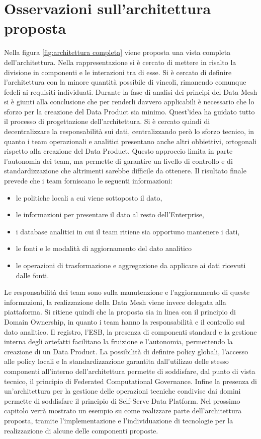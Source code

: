 \documentclass[12pt]{report}
\begin{document}
\section{Osservazioni sull'architettura proposta}
Nella figura \ref{fig:architettura completa} viene proposta una vista completa dell'architettura.
Nella rappresentazione si è cercato di mettere in risalto la divisione in componenti e le interazioni tra di esse.
Si è cercato di definire l'architettura con la minore quantità possibile di vincoli, rimanendo comunque fedeli ai requisiti individuati.
Durante la fase di analisi dei principi del Data Mesh si è giunti alla conclusione che per renderli davvero applicabili è necessario che lo sforzo per la creazione del Data Product sia minimo.
Quest'idea ha guidato tutto il processo di progettazione dell'architettura.
Si è cercato quindi di decentralizzare la responsabilità sui dati, centralizzando però lo sforzo tecnico, in quanto i team operazionali e analitici presentano anche altri obbiettivi, ortogonali rispetto alla creazione del Data Product.
Questo approccio limita in parte l'autonomia dei team, ma permette di garantire un livello di controllo e di standardizzazione che altrimenti sarebbe difficile da ottenere.
Il risultato finale prevede che i team forniscano le seguenti informazioni:
\begin{itemize}
    \item le politiche locali a cui viene sottoposto il dato,
    \item le informazioni per presentare il dato al resto dell'Enterprise,
    \item i database analitici in cui il team ritiene sia opportuno mantenere i dati,
    \item le fonti e le modalità di aggiornamento del dato analitico
    \item le operazioni di trasformazione e aggregazione da applicare ai dati ricevuti dalle fonti.
\end{itemize}
Le responsabilità dei team sono sulla manutenzione e l'aggiornamento di queste informazioni, la realizzazione della Data Mesh viene invece delegata alla piattaforma.
Si ritiene quindi che la proposta sia in linea con il principio di Domain Ownership, in quanto i team hanno la responsabilità  e il controllo sul dato analitico.
Il registro, l'ESB, la presenza di componenti standard e la gestione interna degli artefatti facilitano la fruizione e l'autonomia, permettendo la creazione di un Data Product.
La possibilità di definire policy globali, l'accesso alle policy locali e la standardizzazione garantita dall'utilizzo delle stesso componenti all'interno dell'architettura permette di soddisfare, dal punto di vista tecnico, il principio di Federated Computational Governance.
Infine la presenza di un'architettura per la gestione delle operazioni tecniche condivise dai domini permette di soddisfare il principio di Self-Serve Data Platform.
Nel prossimo capitolo verrà mostrato un esempio su come realizzare parte dell'architettura proposta, tramite l'implementazione e l'individuazione di tecnologie per la realizzazione di alcune delle componenti proposte.
\end{document}

